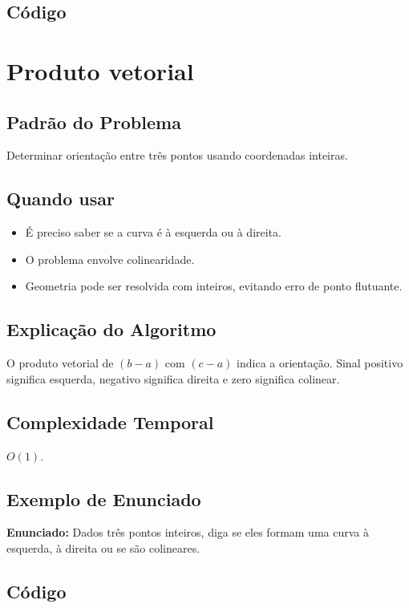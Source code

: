 \subsection{Código}

\section{Produto vetorial}

\subsection{Padrão do Problema}
Determinar orientação entre três pontos usando coordenadas inteiras.

\subsection{Quando usar}
\begin{itemize}[nosep]
  \item É preciso saber se a curva é à esquerda ou à direita.
  \item O problema envolve colinearidade.
  \item Geometria pode ser resolvida com inteiros, evitando erro de ponto flutuante.
\end{itemize}

\subsection{Explicação do Algoritmo}
O produto vetorial de $(b-a)$ com $(c-a)$ indica a orientação. Sinal positivo significa esquerda, negativo significa direita e zero significa colinear.

\subsection{Complexidade Temporal}
$O(1)$.

\subsection{Exemplo de Enunciado}
\begin{exemplodiabox}
\textbf{Enunciado:} Dados três pontos inteiros, diga se eles formam uma curva à esquerda, à direita ou se são colineares.
\end{exemplodiabox}

\subsection{Código}
